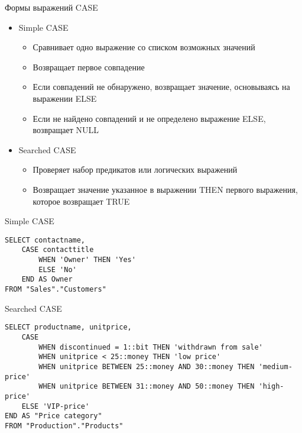 \documentclass[12pt]{article}
\begin{document}
\begin{nota}{Формы выражений CASE}
    \begin{itemize}
        \item Simple CASE 
        
        \begin{itemize}
            \item Сравнивает одно выражение со списком возможных значений 
            \item Возвращает первое совпадение
            \item Если совпадений не обнаружено, возвращает значение, основываясь на выражении ELSE
            \item Если не найдено совпадений и не определено выражение ELSE, возвращает NULL
        \end{itemize}
        
        \item Searched CASE 
        
        \begin{itemize}
            \item Проверяет набор предикатов или логических выражений 
            \item Возвращает значение указанное в выражении THEN первого выражения, которое возвращает TRUE
        \end{itemize}
    \end{itemize}
\end{nota}

\begin{Example}{Simple CASE}
    \begin{lstlisting}
SELECT contactname,
    CASE contacttitle
        WHEN 'Owner' THEN 'Yes'
        ELSE 'No'
    END AS Owner
FROM "Sales"."Customers"
    \end{lstlisting}
\end{Example}

\begin{Example}{Searched CASE}
    \begin{lstlisting}
SELECT productname, unitprice,
    CASE 
        WHEN discontinued = 1::bit THEN 'withdrawn from sale'
        WHEN unitprice < 25::money THEN 'low price'
        WHEN unitprice BETWEEN 25::money AND 30::money THEN 'medium-price'
        WHEN unitprice BETWEEN 31::money AND 50::money THEN 'high-price'
    ELSE 'VIP-price'
END AS "Price category"
FROM "Production"."Products"
    \end{lstlisting}
\end{Example}
\end{document}
